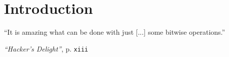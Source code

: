 \section{Introduction}\label{sec:introduction}
\epigraph{
``It is amazing what can be done
with just [...] some bitwise operations.''
}{
\emph{``Hacker's Delight''}, p. \texttt{xiii}
\cite{Warren:2012:HD:2462741}
}
